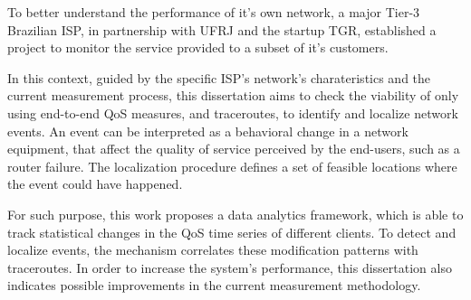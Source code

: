 To better understand the performance of it's own network, a major
Tier-3 Brazilian ISP, in partnership with UFRJ and the startup TGR,
established a project to monitor the service provided to a subset
of it's customers.

In this context, guided by the specific ISP's network's charateristics
and the current measurement process,
this dissertation aims to check the viability of
only using end-to-end QoS measures, and traceroutes,
to identify and localize network events. An event can be interpreted as a
behavioral change in a network equipment, that affect the quality of service
perceived by the end-users,
such as a router failure. The localization procedure defines a set of
feasible locations where the event could have happened.

For such purpose, this work proposes a data analytics framework, which is able
to track statistical changes in the QoS time series of different
clients.
To detect and localize events, the mechanism correlates these modification
patterns with traceroutes.
In order to increase the system's performance,
this dissertation also indicates possible improvements in the current
measurement methodology.
